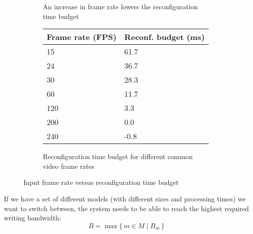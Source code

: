 \begin{figure}[htbp]
    \centering
    \begin{subfigure}[b]{0.48\textwidth}
        \begin{adjustbox}{width=\linewidth}
        
        \end{adjustbox}
        \caption{An increase in frame rate lowers the reconfiguration time budget}
        \label{}
    \end{subfigure}
    \hfill
    \begin{subfigure}[b]{0.48\textwidth}
        \begin{tabular}{@{}ll@{}}
        \toprule
        Frame rate (FPS) & Reconf. budget (ms) \\ \midrule
        15               & 61.7                \\
        24               & 36.7                \\
        30               & 28.3                \\
        60               & 11.7                \\
        120              & 3.3                 \\
        200              & 0.0                 \\
        240              & -0.8                \\ \bottomrule
        \end{tabular}
        \caption{Reconfiguration time budget for different common video frame rates}
        \label{tab:common_fps}
    \end{subfigure}
    \caption[]{Input frame rate versus reconfiguration time budget}
    \label{fig:frame_rate_versus_time_budget}
\end{figure}

If we have a set of different models (with different sizes and processing times) we want to switch between, the system needs to be able to reach the highest required writing bandwidth:
\begin{equation}
    B = \max\{\,m \in M \mid B_m \,\} 
\end{equation}

